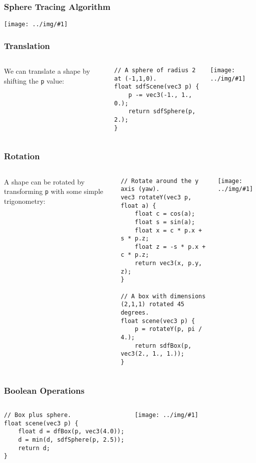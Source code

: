 \documentclass{beamer}
\newcommand\graphic[1]{\texttt{[image: ../img/\#1]}}
\begin{document}
\begin{frame}
    \frametitle{Sphere Tracing Algorithm}
    \graphic{ray-marching-overview.png}
\end{frame}

\begin{frame}[fragile]
    \frametitle{Translation}
    \begin{columns}
        We can translate a shape by shifting the \texttt{p} value:

        \begin{verbatim}
// A sphere of radius 2 at (-1,1,0).
float sdfScene(vec3 p) {
    p -= vec3(-1., 1., 0.);
    return sdfSphere(p, 2.);
}
        \end{verbatim}
        \graphic{translated-sphere.png}
    \end{columns}
\end{frame}

\begin{frame}[fragile]
    \frametitle{Rotation}
    \begin{columns}
        A shape can be rotated by transforming \texttt{p} with some simple
        trigonometry:


        \begin{verbatim}
// Rotate around the y axis (yaw).
vec3 rotateY(vec3 p, float a) {
    float c = cos(a);
    float s = sin(a);
    float x = c * p.x + s * p.z;
    float z = -s * p.x + c * p.z;
    return vec3(x, p.y, z);
}

// A box with dimensions (2,1,1) rotated 45 degrees.
float scene(vec3 p) {
    p = rotateY(p, pi / 4.);
    return sdfBox(p, vec3(2., 1., 1.));
}
        \end{verbatim}
        \graphic{rotated-box.png}
    \end{columns}
\end{frame}

\begin{frame}[fragile]
    \frametitle{Boolean Operations}
    \begin{columns}
        \begin{verbatim}
// Box plus sphere.
float scene(vec3 p) {
    float d = dfBox(p, vec3(4.0));
    d = min(d, sdfSphere(p, 2.5));
    return d;
}
        \end{verbatim}
        \graphic{box-plus-sphere.png}
    \end{columns}
\end{frame}
\end{document}
